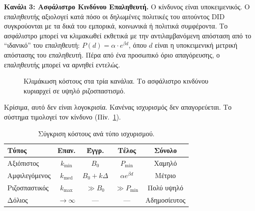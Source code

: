 \documentclass[11pt,a4paper,twocolumn]{article}
\begin{document}
\textbf{Κανάλι 3: Ασφάλιστρο Κινδύνου Επαληθευτή.} Ο κίνδυνος είναι υποκειμενικός. Ο επαληθευτής αξιολογεί κατά πόσο οι δηλωμένες πολιτικές του αιτούντος DID συγκρούονται με τα δικά του εμπορικά, κοινωνικά ή πολιτικά συμφέροντα. Το ασφάλιστρο μπορεί να κλιμακωθεί εκθετικά με την αντιλαμβανόμενη απόσταση από το ``ιδανικό'' του επαληθευτή: $P(d) = \alpha \cdot e^{\beta d}$, όπου $d$ είναι η υποκειμενική μετρική απόστασης του επαληθευτή. Πέρα από ένα προσωπικό όριο απαγόρευσης, ο επαληθευτής μπορεί να αρνηθεί εντελώς.

\begin{figure}[ht]
\centering
{}
\caption{Κλιμάκωση κόστους στα τρία κανάλια. Το ασφάλιστρο κινδύνου κυριαρχεί σε υψηλό ριζοσπαστισμό.}
\label{fig:radicalism}
\end{figure}

Κρίσιμα, αυτό δεν είναι λογοκρισία. Κανένας ισχυρισμός δεν απαγορεύεται. Το σύστημα τιμολογεί τον κίνδυνο (Πίν.~\ref{tab:costs}).

\begin{table}[ht]
\centering
\caption{Σύγκριση κόστους ανά τύπο ισχυρισμού.}
\label{tab:costs}
\footnotesize
\begin{tabular}{@{}lcccc@{}}
\toprule
\textbf{Τύπος} & \textbf{Επαν.} & \textbf{Έγγρ.} & \textbf{Τέλος} & \textbf{Σύνολο} \\
\midrule
Αξιόπιστος & $k_{\min}$ & $B_0$ & $P_{\min}$ & Χαμηλό \\
Αμφιλεγόμενος & $k_{\text{med}}$ & $B_0{+}k\Delta$ & $\alpha e^{\beta d}$ & Μέτριο \\
Ριζοσπαστικός & $k_{\max}$ & $\gg B_0$ & $\gg P_{\min}$ & Πολύ υψηλό \\
Δόλιος & $\to\infty$ & --- & --- & Αδημοσίευτος \\
\bottomrule
\end{tabular}
\end{table}
\end{document}
